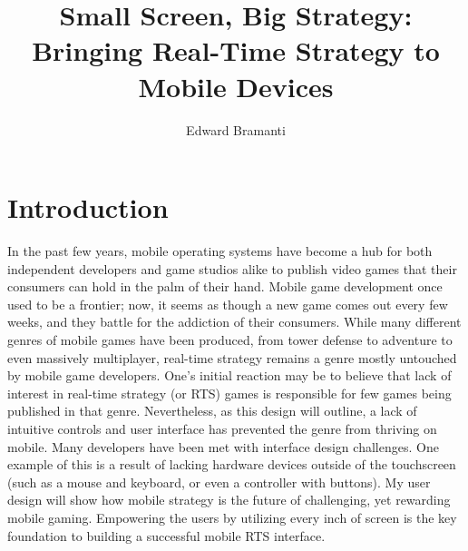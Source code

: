 \documentclass[11pt]{article}
\title{Small Screen, Big Strategy: Bringing Real-Time Strategy to Mobile Devices}
\author{Edward Bramanti}
\begin{document}
\maketitle
{}
\pagebreak
\section{Introduction}
In the past few years, mobile operating systems have become a hub for both independent developers and game studios alike to publish video games that their consumers can hold in the palm of their hand. Mobile game development once used to be a frontier; now, it seems as though a new game comes out every few weeks, and they battle for the addiction of their consumers. While many different genres of mobile games have been produced, from tower defense to adventure to even massively multiplayer, real-time strategy remains a genre mostly untouched by mobile game developers. One's initial reaction may be to believe that lack of interest in real-time strategy (or RTS) games is responsible for few games being published in that genre. Nevertheless, as this design will outline, a lack of intuitive controls and user interface has prevented the genre from thriving on mobile. Many developers have been met with interface design challenges. One example of this is a result of lacking hardware devices outside of the touchscreen (such as a mouse and keyboard, or even a controller with buttons). My user design will show how mobile strategy is the future of challenging, yet rewarding mobile gaming. Empowering the users by utilizing every inch of screen is the key foundation to building a successful mobile RTS interface.
\end{document}
